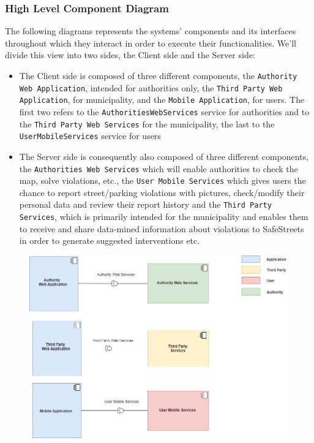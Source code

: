 \documentclass[12pt,a4paper]{article}
\begin{document}
\subsubsection{High Level Component Diagram}
The following diagrams represents the systems' components and its interfaces throughout which they interact in order to execute their functionalities. We'll divide this view into two sides, the Client side and the Server side:
\begin{itemize}
\item The Client side is composed of three different components, the \texttt{Authority Web Application}, intended for authorities only, the \texttt{Third Party Web Application}, for municipality, and the \texttt{Mobile Application}, for users. The first two refers to the \texttt{AuthoritiesWebServices} service for authorities and to the \texttt{Third Party Web Services} for the municipality, the last to the \texttt{UserMobileServices} service for users
\item The Server side is consequently also composed of three different components, the \texttt{Authorities Web Services} which will enable authorities to check the map, solve violations, etc., the \texttt{User Mobile Services} which gives users the chance to report street/parking violations with pictures, check/modify their personal data and review their report history and the \texttt{Third Party Services}, which is primarily intended for the municipality and enables them to receive and share data-mined information about violations to SafeStreets in order to generate suggested interventions etc.
\end{itemize}
\begin{figure}[H]
		\centering
		\includegraphics[width=0.9\linewidth]{../assets/images/COMPONENT VIEW.png}
	\end{figure}
\end{document}
